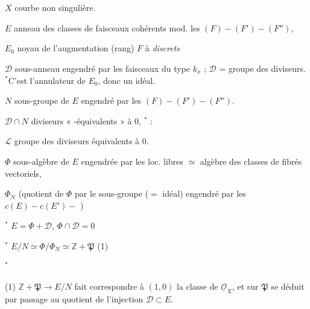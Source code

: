 \documentclass[11pt,a4paper]{article}
\begin{document}
\section*{}


$X$ courbe non singulière.

$E$ anneau des classes de faisceaux cohérents mod. les $(F) - (F') - (F'')$,
\ill{}

$E_{0}$ noyau de l'augmentation \quad (rang) \quad \ill{} $F$ à
 \emph{discrets}

$\mathcal{D}$ sous-anneau engendré par les faisceaux  du
type $k_{x}$ ; \quad $\mathcal{D}$ = groupe des diviseurs. \quad ${}^{*}$C'est
l'annulateur de $E_{0}$, donc un idéal.

$N$ sous-groupe de $E$ engendré par les $(F) - (F') - (F'')$.

$\mathcal{D} \cap N$ \struck{\ill{}} diviseurs « -équivalents »
à $0$, ${}^{*}$\struck{\ill{}}  :

$\mathcal{L}$ groupe des diviseurs équivalents à $0$.

$\Phi$ sous-algèbre de $E$ engendrée par les  loc. libres
\quad $\simeq$ algèbre des classes de fibrés vectoriels, \ill{}

$\Phi_{N}$ (quotient de $\Phi$ par le sous-groupe ($=$ idéal) engendré par les
$c(E) - c(E') -{}$ )


${}^{*}$ $E = \Phi + \mathcal{D}$, \quad $\Phi \cap \mathcal{D} = 0$

${}^{*}$ $E/N \simeq \Phi/\Phi_{N} \simeq \mathbb{Z} + \mathfrak{P}$ \quad (1)

${}^{*}$ \struck{\ill{}}


(1) $\mathbb{Z} + \mathfrak{P} \to E/N$ fait correspondre à $(1,0)$ la classe
de $\underline{\mathcal{O}}_{X}$, et sur $\mathfrak{P}$ se déduit par
passage au quotient de l'injection $\mathcal{D} \subset E$.
\end{document}
